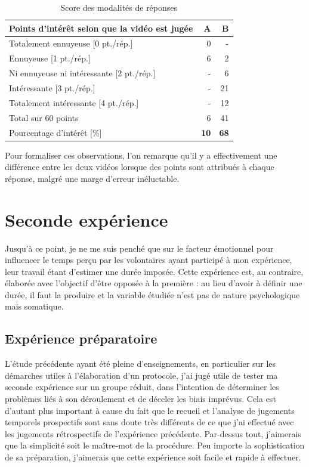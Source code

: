 \documentclass[12pt,fleqn,oneside,french,openany]{book} %
\begin{document}
\begin{table}[h]
	\centering
	\caption{Score des modalités de réponses} \label{tbl:analyse1.2}
	\begin{tabular}{lrr}
		\toprule
		\textbf{Points d'intérêt selon que la vidéo est jugée} & \textbf{A} & \textbf{B} \\ \midrule
		Totalement ennuyeuse [0 pt./rép.] & 0 & - \\ 
		Ennuyeuse [1 pt./rép.] & 6 & 2 \\
		Ni ennuyeuse ni intéressante [2 pt./rép.] & - & 6 \\
		Intéressante [3 pt./rép.] & - & 21 \\ 
		Totalement intéressante [4 pt./rép.] & - & 12 \\ \cmidrule{2-3}
		Total sur 60 points & 6 & 41 \\ 
		Pourcentage d'intérêt [\%] & \textbf{10} & \textbf{68} \\ \bottomrule
	\end{tabular}
\end{table}

Pour formaliser ces observations, l'on remarque qu'il y a effectivement une différence entre les deux vidéos lorsque des points sont attribués à chaque réponse, malgré une marge d'erreur inéluctable.

\newpage
\section{Seconde expérience} \label{sec:exp2.1}
Jusqu'à ce point, je ne me suis penché que sur le facteur émotionnel pour influencer le temps perçu par les volontaires ayant participé à mon expérience, leur travail étant d'estimer une durée imposée. Cette expérience est, au contraire, élaborée avec l'objectif d'être opposée à la première : au lieu d'avoir à définir une durée, il faut la produire et la variable étudiée n'est pas de nature psychologique mais somatique. 

\subsection{Expérience préparatoire} \label{ssec:but2.1}
L'étude précédente ayant été pleine d'enseignements, en particulier sur les démarches utiles à l'élaboration d'un protocole, j'ai jugé utile de tester ma seconde expérience sur un groupe réduit, dans l'intention de déterminer les problèmes liés à son déroulement et de déceler les biais imprévus. Cela est d'autant plus important à cause du fait que le recueil et l'analyse de jugements temporels prospectifs sont sans doute très différents de ce que j'ai effectué avec les jugements rétrospectifs de l'expérience précédente. Par-dessus tout, j'aimerais que la simplicité soit le maître-mot de la procédure. Peu importe la sophistication de sa préparation, j'aimerais que cette expérience soit facile et rapide à effectuer.
\end{document}
